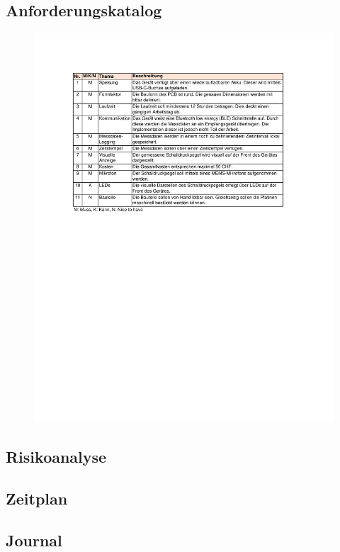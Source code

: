 \documentclass[12pt]{article}
\begin{document}
	\subsection{Anforderungskatalog}\label{Anhang:Anforderungskatalog}
	\begin{figure}[H]
		\centering
		\includegraphics[trim= 2.5cm 5cm 0cm 3.5cm, width=1.2\linewidth]{images/BAT_Anforderungskatalog}
	\end{figure}
	
	\newpage
	\thispagestyle{empty} 
	\subsection{Risikoanalyse}\label{Anhang:Risikoanalyse}
		\begin{minipage}[b]{\textwidth}
		
	\end{minipage}
	
	\newpage
	\thispagestyle{empty} 
	\subsection{Zeitplan}\label{Anhang:Zeitplan}
	\begin{minipage}[b]{\textwidth}
		
	\end{minipage}
	
	\newpage
	\thispagestyle{empty} 
	\subsection{Journal}
	
\end{document}

